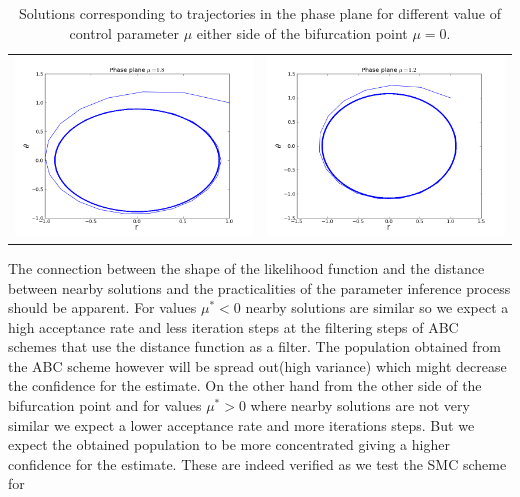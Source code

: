 \documentclass[12pt,a4paper,titlepage]{article}
\begin{document}
\begin{table}[ht]
\begin{tabular}{cc}
\includegraphics[scale=0.3]{phase_hopf08}&\includegraphics[scale=0.3]{phase_hopf12}\\
\end{tabular}
\caption{Solutions corresponding to trajectories in the phase plane for different value of
control parameter $\mu$ either side of the bifurcation point $\mu = 0$.}
\label{fig:phase_plane_hopf}
\end{table}

The connection between the shape of the likelihood function and the distance between nearby solutions and the practicalities of the parameter inference process should be apparent. For values $\mu^* < 0$ nearby solutions are similar so we expect a high acceptance rate and less iteration steps at the filtering steps of ABC schemes that use the distance function as a filter. The population obtained from the ABC scheme however will be spread out(high variance) which might decrease the confidence for the estimate. On the other hand from the other side of the bifurcation point and for values $\mu^* > 0$ where nearby solutions are not very similar we expect a lower acceptance rate and more iterations steps. But we expect the obtained population to be more concentrated giving a higher confidence for the estimate. These are indeed verified as we test the SMC scheme for%
\end{document}
